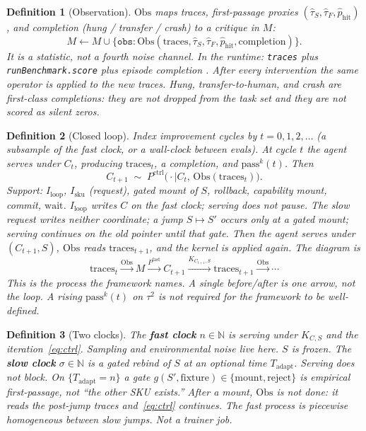 \documentclass{article}
\newtheorem{definition}{Definition}
\begin{document}
\begin{definition}[Observation]
\(\mathrm{Obs}\) maps traces, first-passage proxies \((\hat\tau_S,\hat\tau_F,\hat p_{\mathrm{hit}})\), and completion (hung / transfer / crash) to a critique in \(M\):
\[
M \leftarrow M \cup \{\texttt{obs}: \mathrm{Obs}(\mathrm{traces},\hat\tau_S,\hat\tau_F,\hat p_{\mathrm{hit}},\mathrm{completion})\}.
\]
It is a statistic, not a fourth noise channel. In the runtime: \texttt{traces} plus \texttt{runBenchmark.score} plus episode completion \citep{vdomharness}. After every intervention the same operator is applied to the \emph{new} traces. Hung, transfer-to-human, and crash are first-class completions: they are not dropped from the task set and they are not scored as silent zeros.
\end{definition}

\begin{definition}[Closed loop]
\label{def:loop}
Index improvement cycles by \(t=0,1,2,\ldots\) (a subsample of the fast clock, or a wall-clock between evals). At cycle \(t\) the agent serves under \(C_t\), producing \(\mathrm{traces}_t\), a completion, and \(\mathrm{pass}^k(t)\). Then
\[
C_{t+1}\;\sim\; P^{\mathrm{ctrl}}\big(\cdot\mid C_t,\,\mathrm{Obs}(\mathrm{traces}_t)\big).
\]
Support: \(I_{\mathrm{loop}}\), \(I_{\mathrm{sku}}\) (request), gated mount of \(S\), rollback, capability mount, commit, \(\mathrm{wait}\). \(I_{\mathrm{loop}}\) writes \(C\) on the fast clock; serving does not pause. The slow request writes neither coordinate; a jump \(S\mapsto S'\) occurs only at a gated mount; serving continues on the old pointer until that gate. Then the agent serves under \((C_{t+1},S)\), \(\mathrm{Obs}\) reads \(\mathrm{traces}_{t+1}\), and the kernel is applied again. The diagram is
\[
\mathrm{traces}_t \xrightarrow{\mathrm{Obs}} M \xrightarrow{P^{\mathrm{fast}}} C_{t+1} \xrightarrow{K_{C_{t+1},S}} \mathrm{traces}_{t+1} \xrightarrow{\mathrm{Obs}} \cdots
\]
This is the process the framework names. A single before/after is one arrow, not the loop. A rising \(\mathrm{pass}^k(t)\) on \(\tau^2\) is not required for the framework to be well-defined.
\end{definition}

\begin{definition}[Two clocks]
The \textbf{fast clock} \(n\in\mathbb{N}\) is serving under \(K_{C,S}\) and the iteration~\eqref{eq:ctrl}. Sampling and environmental noise live here. \(S\) is frozen. The \textbf{slow clock} \(\sigma\in\mathbb{N}\) is a gated rebind of \(S\) at an optional time \(T_{\mathrm{adapt}}\). Serving does not block. On \(\{T_{\mathrm{adapt}}=n\}\) a gate \(g(S',\text{fixture})\in\{\mathrm{mount},\mathrm{reject}\}\) is empirical first-passage, not ``the other SKU exists.'' After a mount, \(\mathrm{Obs}\) is not done: it reads the post-jump traces and~\eqref{eq:ctrl} continues. The fast process is piecewise homogeneous between slow jumps. Not a trainer job.
\end{definition}
\end{document}
